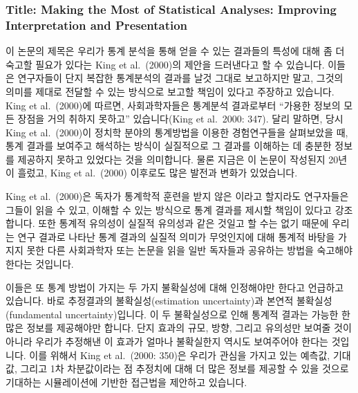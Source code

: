 \documentclass[
]{book}
\begin{document}
\hypertarget{title-making-the-most-of-statistical-analyses-improving-interpretation-and-presentation}{%
\subsubsection{Title: Making the Most of Statistical Analyses: Improving Interpretation and Presentation}\label{title-making-the-most-of-statistical-analyses-improving-interpretation-and-presentation}}

이 논문의 제목은 우리가 통계 분석을 통해 얻을 수 있는 결과들의 특성에 대해 좀 더 숙고할 필요가 있다는 King et al.~(2000)의 제안을 드러낸다고 할 수 있습니다. 이들은 연구자들이 단지 복잡한 통계분석의 결과를 날것 그대로 보고하지만 말고, 그것의 의미를 제대로 전달할 수 있는 방식으로 보고할 책임이 있다고 주장하고 있습니다. King et al.~(2000)에 따르면, 사회과학자들은 통계분석 결과로부터 ``가용한 정보의 모든 장점을 거의 취하지 못하고'' 있습니다(King et al.~2000: 347). 달리 말하면, 당시 King et al.~(2000)이 정치학 분야의 통계방법을 이용한 경험연구들을 살펴보았을 때, 통계 결과를 보여주고 해석하는 방식이 실질적으로 그 결과를 이해하는 데 충분한 정보를 제공하지 못하고 있었다는 것을 의미합니다. 물론 지금은 이 논문이 작성된지 20년이 흘렀고, King et al.~(2000) 이후로도 많은 발전과 변화가 있었습니다.

King et al.~(2000)은 독자가 통계학적 훈련을 받지 않은 이라고 할지라도 연구자들은 그들이 읽을 수 있고, 이해할 수 있는 방식으로 통계 결과를 제시할 책임이 있다고 강조합니다. 또한 통계적 유의성이 실질적 유의성과 같은 것일고 할 수는 없기 때문에 우리는 연구 결과로 나타난 통계 결과의 실질적 의미가 무엇인지에 대해 통계적 바탕을 가지지 못한 다른 사회과학자 또는 논문을 읽을 일반 독자들과 공유하는 방법을 숙고해야 한다는 것입니다.

이들은 또 통계 방법이 가지는 두 가지 불확실성에 대해 인정해야만 한다고 언급하고 있습니다. 바로 추정결과의 불확실성(estimation uncertainty)과 본연적 불확실성(fundamental uncertainty)입니다. 이 두 불확실성으로 인해 통계적 결과는 가능한 한 많은 정보를 제공해야만 합니다. 단지 효과의 규모, 방향, 그리고 유의성만 보여줄 것이 아니라 우리가 추정해낸 이 효과가 얼마나 불확실한지 역시도 보여주어야 한다는 것입니다. 이를 위해서 King et al.~(2000: 350)은 우리가 관심을 가지고 있는 예측값, 기대값, 그리고 1차 차분값이라는 점 추정치에 대해 더 많은 정보를 제공할 수 있을 것으로 기대하는 시뮬레이션에 기반한 접근법을 제안하고 있습니다.
\end{document}
